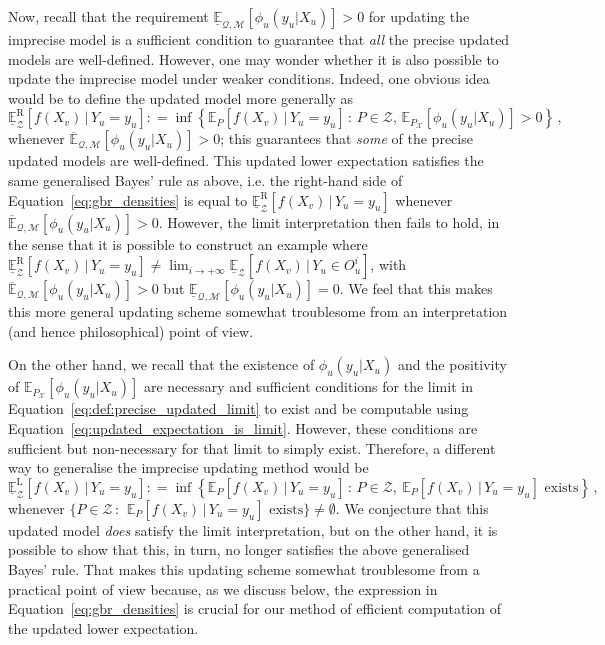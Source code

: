 \documentclass[twoside,11pt]{article}
\newcommand{\states}{\mathcal{X}}
\newcommand{\lexp}{\underline{\mathbb{E}}_{\rateset,\mathcal{M}}}
\newcommand{\uexp}{\overline{\mathbb{E}}_{\rateset,\mathcal{M}}}
\newcommand{\rateset}{\mathcal{Q}}
\newcommand{\coloneqq}{:\!=}
\begin{document}
Now, recall that the requirement $\lexp[\phi_u(y_u\vert X_u)]>0$ for updating the imprecise model is a sufficient condition to guarantee that \emph{all} the precise updated models are well-defined. However, one may wonder whether it is also possible to update the imprecise model under weaker conditions. Indeed, one obvious idea would be to define the updated model more generally as
\begin{equation*}
\underline{\mathbb{E}}_\mathcal{Z}^\mathrm{R}[f(X_v)\,\vert\,Y_u=y_u] \coloneqq \inf\left\{ \mathbb{E}_P[f(X_v)\,\vert\,Y_u=y_u]\,:\, P\in\mathcal{Z},\,\mathbb{E}_{P_\states}[\phi_u(y_u\vert X_u)]>0 \right\}\,,
\end{equation*}
whenever $\uexp[\phi_u(y_u\vert X_u)]>0$; this guarantees that \emph{some} of the precise updated models are well-defined. This updated lower expectation satisfies the same generalised Bayes' rule as above, i.e. the right-hand side of Equation~\eqref{eq:gbr_densities} is equal to $\underline{\mathbb{E}}_\mathcal{Z}^\mathrm{R}[f(X_v)\,\vert\,Y_u=y_u]$ whenever $\uexp[\phi_u(y_u\vert X_u)]>0$. However, the limit interpretation then fails to hold, in the sense that it is possible to construct an example where $\underline{\mathbb{E}}_\mathcal{Z}^\mathrm{R}[f(X_v)\,\vert\,Y_u=y_u] \neq \lim_{i\to+\infty} \underline{\mathbb{E}}_\mathcal{Z}[f(X_v)\,\vert\,Y_u\in O_u^i]$, with $\uexp[\phi_u(y_u\vert X_u)]>0$ but $\lexp[\phi_u(y_u\vert X_u)]=0$. We feel that this makes this more general updating scheme somewhat troublesome from an interpretation (and hence philosophical) point of view.

On the other hand, we recall that the existence of $\phi_u(y_u\vert X_u)$ and the positivity of $\mathbb{E}_{P_\states}[\phi_u(y_u\vert X_u)]$ are necessary and sufficient conditions for the limit in Equation~\eqref{eq:def:precise_updated_limit} to exist and be computable using Equation~\eqref{eq:updated_expectation_is_limit}. However, these conditions are sufficient but non-necessary for that limit to simply exist. Therefore, a different way to generalise the imprecise updating method would be
\begin{equation*}
\underline{\mathbb{E}}_\mathcal{Z}^\mathrm{L}[f(X_v)\,\vert\,Y_u=y_u] \coloneqq \inf\left\{ \mathbb{E}_P[f(X_v)\,\vert\,Y_u=y_u]\,:\, P\in\mathcal{Z},~\text{$\mathbb{E}_P[f(X_v)\,\vert\,Y_u=y_u]$ exists} \right\}\,,
\end{equation*}
whenever $\{P\in\mathcal{Z}\,:\,~\text{$\mathbb{E}_P[f(X_v)\,\vert\,Y_u=y_u]$ exists}\}\neq\emptyset$. We conjecture that this updated model \emph{does} satisfy the limit interpretation, but on the other hand, it is possible to show that this, in turn, no longer satisfies the above generalised Bayes' rule. That makes this updating scheme somewhat troublesome from a practical point of view because, as we discuss below, the expression in Equation~\eqref{eq:gbr_densities} is crucial for our method of efficient computation of the updated lower expectation.
\end{document}
